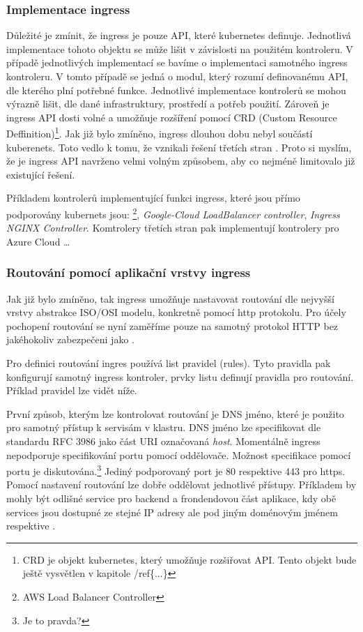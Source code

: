 \subsubsection{Implementace ingress}
Důležité je zmínit, že ingress je pouze API, které kubernetes definuje. Jednotlivá implementace tohoto objektu se může lišit v závislosti na použitém kontroleru. V případě jednotlivých implementací se bavíme o implementaci samotného ingress kontroleru. V tomto případě se jedná o modul, který rozumí definovanému API, dle kterého plní potřebné funkce. Jednotlivé implementace kontrolerů se mohou výrazně lišit, dle dané infrastruktury, prostředí a potřeb použití. Zároveň je ingress API dosti volné a umožňuje rozšíření pomocí CRD (Custom Resource Deffinition)\footnote{CRD je objekt kubernetes, který umožňuje rozšiřovat API. Tento objekt bude ještě vysvětlen v kapitole /ref\{...\}}. Jak již bylo zmíněno, ingress dlouhou dobu nebyl součástí kuberenets. Toto vedlo k tomu, že vznikali řešení třetích stran \cite{kashin_2021_gateway}. Proto si myslím, že je ingress API navrženo velmi volným způsobem, aby co nejméně limitovalo již existující řešení.

Příkladem kontrolerů implementující funkci ingress, které jsou přímo podporovány kubernets  jsou: \footnote{AWS Load Balancer Controller}, \textit{Google-Cloud LoadBalancer controller}, \textit{Ingress NGINX Controller}. Komtrolery třetích stran pak implementují kontrolery pro Azure Cloud \ldots

\subsubsection{Routování pomocí aplikační vrstvy ingress}
Jak již bylo zmíněno, tak ingress umožňuje nastavovat routování dle nejvyšší vrstvy abstrakce ISO/OSI modelu, konkretně pomocí http protokolu. Pro účely pochopení routování se nyní zaměříme pouze na samotný protokol HTTP bez jakéhokoliv zabezpečeni jako .

Pro definici routování ingres používá list pravidel (rules). Tyto pravidla pak konfigurují samotný ingress kontroler, prvky listu definují pravidla pro routování. Příklad pravidel lze vidět níže.


První způsob, kterým lze kontrolovat routování je DNS jméno, které je použito pro samotný přístup k servisám v klastru. DNS jméno lze specifikovat dle standardu RFC 3986 jako část URI označovaná \textit{host}. Momentálně ingress nepodporuje specifikování portu pomocí \term{:} oddělovače. Možnost specifikace pomocí portu je diskutována.\footnote{Je to pravda?}  Jediný podporovaný port je 80 respektive 443 pro https. Pomocí nastavení routování lze dobře oddělovat jednotlivé přístupy. Příkladem by mohly být odlišné service pro backend a frondendovou část aplikace, kdy obě services jsou dostupné ze stejné IP adresy ale pod jiným doménovým jménem  respektive .

